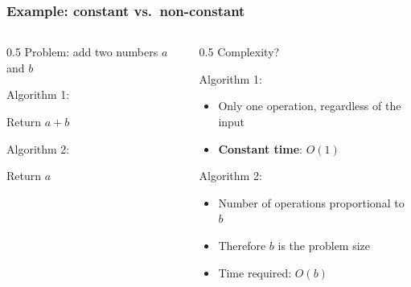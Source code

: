 \documentclass[aspectratio=169,hyperref={bookmarks=false,urlcolor=blue,colorlinks=true},10pt]{beamer}
\begin{document}
\begin{frame}
  \frametitle{Example: constant vs.\ non-constant}

  \begin{columns}
    \begin{column}{0.5\textwidth}
      Problem: add two numbers $a$ and $b$

      \pause
      \vspace{\baselineskip}

      Algorithm 1:
      \begin{algorithm}[H]
        Return $a + b$
      \end{algorithm}

      \pause
      \vspace{\baselineskip}

      Algorithm 2:
      \begin{algorithm}[H]
        Return $a$\;
      \end{algorithm}
    \end{column}
    \begin{column}{0.5\textwidth}
      \pause
      Complexity?

      \pause
      \vspace{\baselineskip}

      Algorithm 1:
      \begin{itemize}
      \item Only one operation, regardless of the input
      \item \textbf{Constant time}: $O(1)$
      \end{itemize}

      \pause
      \vspace{\baselineskip}

      Algorithm 2:
      \begin{itemize}
      \item Number of operations proportional to $b$
      \item Therefore $b$ is the problem size
      \item Time required: $O(b)$
      \end{itemize}
    \end{column}
  \end{columns}
\end{frame}
\end{document}
